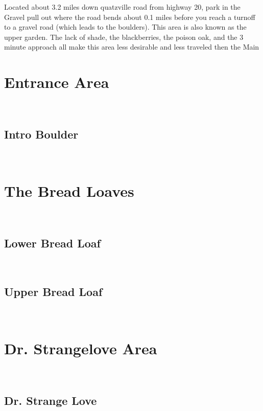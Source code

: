 \begin{multicols*}{2}
Located about 3.2 miles down quatzville road from highway 20, park in the Gravel pull out where the road bends about 0.1 miles before you reach a turnoff to a gravel road (which leads to the boulders). This area is also known as the upper garden. The lack of shade, the blackberries, the poison oak, and the 3 minute approach all make this area less desirable and less traveled then the Main

		\section{Entrance Area}\label{sa:Entrance Area}
	\
			\subsection*{Intro Boulder}\label{bf:Intro Boulder}
			\
			
		\section{The Bread Loaves}\label{sa:The Bread Loaves}
	\
			\subsection*{Lower Bread Loaf}\label{bf:Lower Bread Loaf}
			\
			
			\subsection*{Upper Bread Loaf}\label{bf:Upper Bread Loaf}
			\
			
		\section{Dr. Strangelove Area}\label{sa:Dr. Strangelove Area}
	\
			\subsection*{Dr. Strange Love}\label{bf:Dr. Strange Love}
			\
			
\end{multicols*}
\clearpage